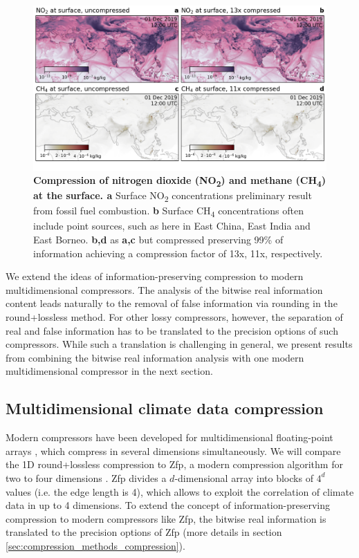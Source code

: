 \begin{figure}[tbhp]
	\includegraphics[width=1\textwidth]{Figures/compression/methane_no2_surface.png}
	\caption{\textbf{Compression of nitrogen dioxide (NO\textsubscript{2}) and methane (CH\textsubscript{4}) at the surface. a}
	Surface NO\textsubscript{2} concentrations preliminary result from fossil fuel combustion. \textbf{b} Surface CH\textsubscript{4}
	concentrations often include point sources, such as here in East China, East India and East Borneo. 
	\textbf{b,d} as \textbf{a,c} but compressed preserving 99\% of information achieving a compression factor of 13x, 11x,
	respectively.}
	\label{fig:methane_no2}
\end{figure}

We extend the ideas of information-preserving compression to modern multidimensional compressors. The analysis of the bitwise
real information content leads naturally to the removal of false information via rounding in the round+lossless method. For other
lossy compressors, however, the separation of real and false information has to be translated to the precision options of such
compressors. While such a translation is challenging in general, we present results from combining the bitwise real information
analysis with one modern multidimensional compressor in the next section.

\subsection{Multidimensional climate data compression}

Modern compressors have been developed for multidimensional floating-point arrays
\citep{Lindstrom2006,Di2016,Ballester-Ripoll2020,Zhao2020,vonLarcher2019}, which compress in
several dimensions simultaneously. We will compare the 1D round+lossless compression to Zfp, a modern compression
algorithm for two to four dimensions \citep{Lindstrom2014,Pinard2020,Poppick2020,Hammerling2019}.
Zfp divides a $d$-dimensional array into blocks of $4^d$  values (i.e. the edge length is 4), which allows to
exploit the correlation of climate data in up to 4 dimensions. To extend the concept of information-preserving
compression to modern compressors like Zfp, the bitwise real information is translated to the precision options of Zfp
(more details in section \ref{sec:compression_methods_compression}).

